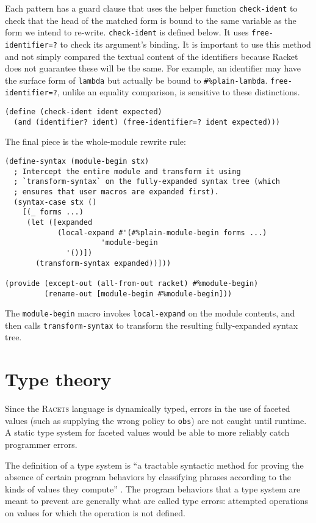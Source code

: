 \documentclass{article}
\begin{document}
Each pattern has a guard clause that uses the helper function \texttt{check-ident} to check that the head of the matched form is bound to the same variable as the form we intend to re-write. \texttt{check-ident} is defined below. It uses \texttt{free-identifier=?} to check its argument's binding. It is important to use this method and not simply compared the textual content of the identifiers because Racket does not guarantee these will be the same. For example, an identifier may have the surface form of \texttt{lambda} but actually be bound to \texttt{\#\%plain-lambda}. \texttt{free-identifier=?}, unlike an equality comparison, is sensitive to these distinctions.

\begin{lstlisting}
(define (check-ident ident expected)
  (and (identifier? ident) (free-identifier=? ident expected)))
\end{lstlisting}

The final piece is the whole-module rewrite rule:

\begin{lstlisting}
(define-syntax (module-begin stx)
  ; Intercept the entire module and transform it using
  ; `transform-syntax` on the fully-expanded syntax tree (which
  ; ensures that user macros are expanded first).
  (syntax-case stx ()
    [(_ forms ...)
     (let ([expanded
            (local-expand #'(#%plain-module-begin forms ...)
	                  'module-begin
			  '())])
       (transform-syntax expanded))]))

(provide (except-out (all-from-out racket) #%module-begin)
         (rename-out [module-begin #%module-begin]))
\end{lstlisting}

The \texttt{module-begin} macro invokes \texttt{local-expand} on the module contents, and then calls \texttt{transform-syntax} to transform the resulting fully-expanded syntax tree.



\section{Type theory}
Since the \textsc{Racets} language is dynamically typed, errors in the use of faceted values (such as supplying the wrong policy to \texttt{obs}) are not caught until runtime. A static type system for faceted values would be able to more reliably catch programmer errors.

The definition of a type system is ``a tractable syntactic method for proving the absence of certain program behaviors by classifying phrases according to the kinds of values they compute'' \cite{types}. The program behaviors that a type system are meant to prevent are generally what are called type errors: attempted operations on values for which the operation is not defined.
\end{document}
